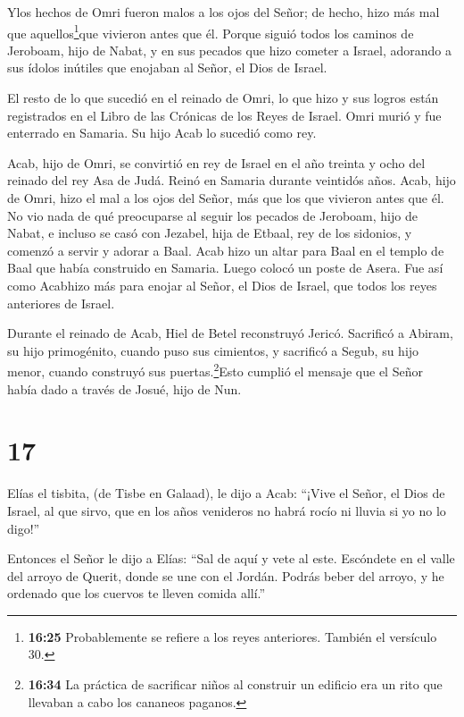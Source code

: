  Ylos hechos de Omri fueron malos a los ojos del Señor; de
hecho, hizo más mal que aquellos\footnote{\textbf{16:25} Probablemente
  se refiere a los reyes anteriores. También el versículo 30.}que
vivieron antes que él.  Porque siguió todos los caminos de
Jeroboam, hijo de Nabat, y en sus pecados que hizo cometer a Israel,
adorando a sus ídolos inútiles que enojaban al Señor, el Dios de Israel.

 El resto de lo que sucedió en el reinado de Omri, lo que
hizo y sus logros están registrados en el Libro de las Crónicas de los
Reyes de Israel.  Omri murió y fue enterrado en Samaria. Su
hijo Acab lo sucedió como rey.

 Acab, hijo de Omri, se convirtió en rey de Israel en el
año treinta y ocho del reinado del rey Asa de Judá. Reinó en Samaria
durante veintidós años.  Acab, hijo de Omri, hizo el mal a
los ojos del Señor, más que los que vivieron antes que él. 
No vio nada de qué preocuparse al seguir los pecados de Jeroboam, hijo
de Nabat, e incluso se casó con Jezabel, hija de Etbaal, rey de los
sidonios, y comenzó a servir y adorar a Baal.  Acab hizo un
altar para Baal en el templo de Baal que había construido en Samaria.
 Luego colocó un poste de Asera. Fue así como Acabhizo más
para enojar al Señor, el Dios de Israel, que todos los reyes anteriores
de Israel.

 Durante el reinado de Acab, Hiel de Betel reconstruyó
Jericó. Sacrificó a Abiram, su hijo primogénito, cuando puso sus
cimientos, y sacrificó a Segub, su hijo menor, cuando construyó sus
puertas.\footnote{\textbf{16:34} La práctica de sacrificar niños al
  construir un edificio era un rito que llevaban a cabo los cananeos
  paganos.}Esto cumplió el mensaje que el Señor había dado a través de
Josué, hijo de Nun.

\hypertarget{section-16}{%
\section{17}\label{section-16}}

 Elías el tisbita, (de Tisbe en Galaad), le dijo a Acab:
``¡Vive el Señor, el Dios de Israel, al que sirvo, que en los años
venideros no habrá rocío ni lluvia si yo no lo digo!''

 Entonces el Señor le dijo a Elías:  ``Sal de
aquí y vete al este. Escóndete en el valle del arroyo de Querit, donde
se une con el Jordán.  Podrás beber del arroyo, y he
ordenado que los cuervos te lleven comida allí.''

